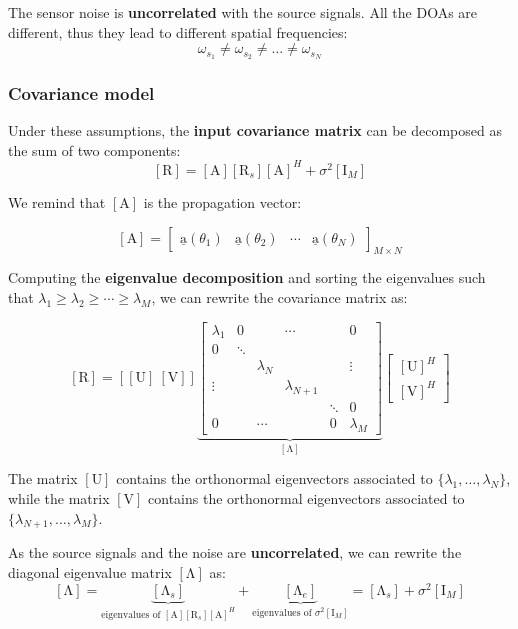 The sensor noise is \textbf{uncorrelated} with the source signals.
All the DOAs are different, thus they lead to different spatial frequencies:
\[
\omega_{s_{1}} \neq \omega_{s_{2}} \neq \dots \neq \omega_{s_{N}}
\]

\subsubsection{Covariance model}
Under these assumptions, the \textbf{input covariance matrix} can be decomposed as the sum of two components:
\[
\left[\mathrm{R}\right] = \left[\mathrm{A}\right] \left[\mathrm{R}_{s}\right] \left[\mathrm{A}\right]^{H} + \sigma^{2} \left[\mathrm{I}_{M}\right]
\]

We remind that $\left[\mathrm{A}\right]$ is the propagation vector:

\[
\left[\mathrm{A}\right] = 
\begin{bmatrix}
\underline{\mathrm{a}}(\theta_1) & \underline{\mathrm{a}}(\theta_2) & \cdots & \underline{\mathrm{a}}(\theta_N)
\end{bmatrix}_{M \times N}
\]

Computing the \textbf{eigenvalue decomposition} and sorting the eigenvalues such that $\lambda_{1} \geq \lambda_{2} \geq \cdots \geq \lambda_{M}$, we can rewrite the covariance matrix as:

\[
\left[\mathrm{R}\right] = \left[ \left[\mathrm{U}\right] \ \left[\mathrm{V}\right] \right]
\underbrace{
\begin{bmatrix}
\lambda_{1} & 0 & & \cdots & & 0 \\
0 & \ddots & & \\
& & \lambda_{N} & & & \vdots \\
\vdots & & & \lambda_{N+1} \\
& & & & \ddots & 0 \\
0 & & \cdots & & 0 & \lambda_{M}
\end{bmatrix}}_{\left[\mathrm{\Lambda}\right]}
\begin{bmatrix}
\left[\mathrm{U}\right]^{H} \\
\left[\mathrm{V}\right]^{H}
\end{bmatrix}
\]

The matrix $\left[\mathrm{U}\right]$ contains the orthonormal eigenvectors associated to $\{\lambda_{1}, \dots, \lambda_{N}\}$, while the matrix $\left[\mathrm{V}\right]$ contains the orthonormal eigenvectors associated to $\{\lambda_{N+1}, \dots, \lambda_{M}\}$.

As the source signals and the noise are \textbf{uncorrelated}, we can rewrite the diagonal eigenvalue matrix $\left[\mathrm{\Lambda}\right]$ as:
\[
\left[\mathrm{\Lambda}\right] = \underbrace{\left[\mathrm{\Lambda}_{s}\right]}_{\text{eigenvalues of } \left[\mathrm{A}\right] \left[\mathrm{R}_{s}\right] \left[\mathrm{A}\right]^{H}} + \underbrace{\left[\mathrm{\Lambda}_{e}\right]}_{\text{eigenvalues of } \sigma^{2} \left[\mathrm{I}_{M}\right]} = \left[\mathrm{\Lambda}_{s}\right] + \sigma^{2} \left[\mathrm{I}_{M}\right]
\]

